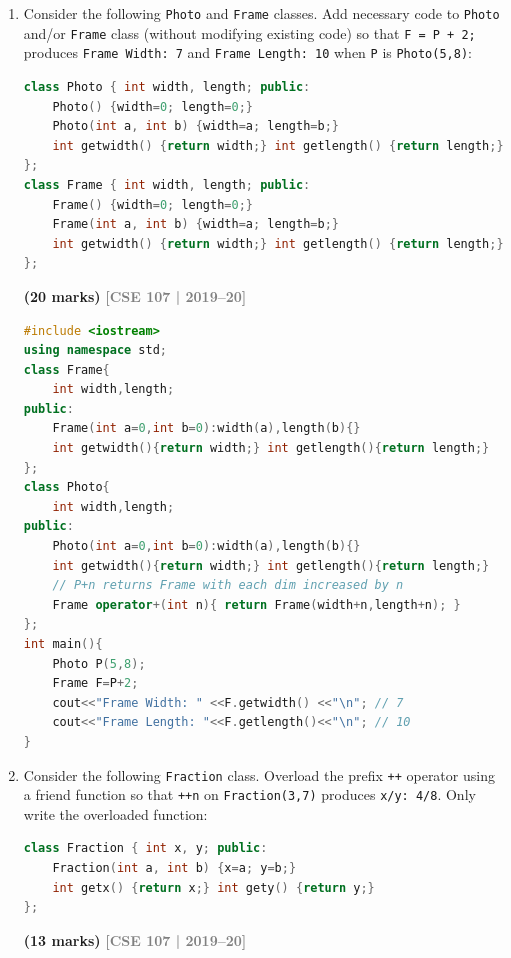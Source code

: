 \documentclass[12pt,a3paper]{article}
\newcommand{\yr}[1]{\hfill\textcolor{gray}{\small\textbf{[#1]}}}
\newcommand{\mk}[1]{\textcolor{orange!70!black}{\small\textbf{(#1 marks)}}}
\begin{document}
\begin{enumerate}
\begin{tcolorbox}
\end{tcolorbox}

\item Consider the following \texttt{Photo} and \texttt{Frame} classes. Add necessary code to \texttt{Photo} and/or \texttt{Frame} class (without modifying existing code) so that \texttt{F = P + 2;} produces \texttt{Frame Width: 7} and \texttt{Frame Length: 10} when \texttt{P} is \texttt{Photo(5,8)}:
\begin{lstlisting}[language=C++]
class Photo { int width, length; public:
    Photo() {width=0; length=0;}
    Photo(int a, int b) {width=a; length=b;}
    int getwidth() {return width;} int getlength() {return length;}
};
class Frame { int width, length; public:
    Frame() {width=0; length=0;}
    Frame(int a, int b) {width=a; length=b;}
    int getwidth() {return width;} int getlength() {return length;}
};
\end{lstlisting}
\mk{20}
\yr{CSE 107 | 2019--20}


\begin{tcolorbox}[enhanced,breakable,ansbox,colback=cF!4,colframe=cF,
  boxrule=0.8pt,arc=5pt,
  title={\textbf{Answer --- Photo + 2 = Frame(7,10)}},
  fonttitle=\bfseries\color{white},colbacktitle=cF]

\begin{lstlisting}[language=C++]
#include <iostream>
using namespace std;
class Frame{
    int width,length;
public:
    Frame(int a=0,int b=0):width(a),length(b){}
    int getwidth(){return width;} int getlength(){return length;}
};
class Photo{
    int width,length;
public:
    Photo(int a=0,int b=0):width(a),length(b){}
    int getwidth(){return width;} int getlength(){return length;}
    // P+n returns Frame with each dim increased by n
    Frame operator+(int n){ return Frame(width+n,length+n); }
};
int main(){
    Photo P(5,8);
    Frame F=P+2;
    cout<<"Frame Width: " <<F.getwidth() <<"\n"; // 7
    cout<<"Frame Length: "<<F.getlength()<<"\n"; // 10
}
\end{lstlisting}

\end{tcolorbox}

\item Consider the following \texttt{Fraction} class. Overload the prefix \texttt{++} operator using a friend function so that \texttt{++n} on \texttt{Fraction(3,7)} produces \texttt{x/y: 4/8}. Only write the overloaded function:
\begin{lstlisting}[language=C++]
class Fraction { int x, y; public:
    Fraction(int a, int b) {x=a; y=b;}
    int getx() {return x;} int gety() {return y;}
};
\end{lstlisting}
\mk{13}
\yr{CSE 107 | 2019--20}


\end{enumerate}
\end{document}
